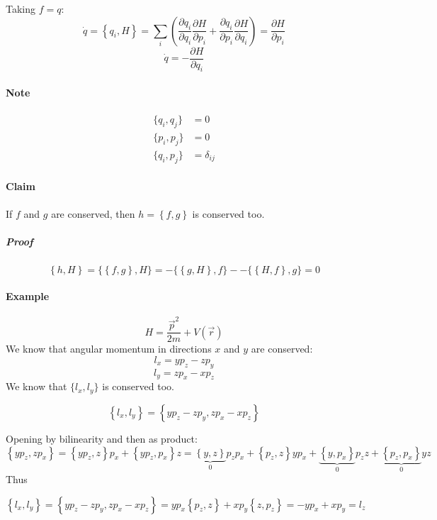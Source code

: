 Taking $f=q$:
$$\dot{q} = \left\{ q_i, H \right\} = \sum_i \left( \frac{\partial q_i}{\partial q_i} \frac{\partial H}{\partial p_i} + \frac{\partial q_i}{\partial p_i} \frac{\partial H}{\partial q_i}  \right) = \frac{\partial H}{\partial p_i}$$
$$\dot{q} = -\frac{\partial H}{\partial q_i}$$

\paragraph{Note}
\begin{align*}
\{q_i,q_j\} &= 0 \\
\{p_i,p_j\} &= 0 \\
\{q_i,p_j\} &= \delta_{ij}
\end{align*}

\paragraph{Claim}
If $f$ and $g$ are conserved, then $h=\left\{ f,g \right\}$ is conserved too.
\subparagraph{Proof}
$$\left\{ h,H \right\} = \big\{ \left\{f,g \right\}, H \big\} = - \big\{ \left\{g,H \right\}, f \big\} - - \big\{ \left\{H,f \right\}, g \big\}  = 0$$

\paragraph{Example}
$$H = \frac{\vec{p}^2}{2m} + V(\vec{r})$$
We know that angular momentum in directions $x$ and $y$ are conserved:
$$l_x = yp_z-zp_y$$
$$l_y = zp_x - xp_z$$
We know that $\{ l_x, l_y \}$ is conserved too.

$$\left\{ l_x, l_y \right\} = \left\{ yp_z - zp_y, zp_x - xp_z \right\}$$

Opening by bilinearity and then as product:
$$\left\{ yp_z, zp_x  \right\} =\left\{ yp_z, z  \right\}p_x + \left\{ yp_z, p_x \right\}z = \underbrace{\left\{ y, z  \right\}}_{0}p_zp_x + \left\{ p_z, z  \right\}yp_x + \underbrace{\left\{ y, p_x \right\}}_{0}p_zz+ \underbrace{\left\{p_z, p_x \right\}}_{0} yz  $$
Thus

$$\left\{ l_x, l_y \right\} = \left\{ yp_z - zp_y, zp_x - xp_z \right\} = yp_x\left\{ p_z, z \right\} + xp_y \left\{ z,p_z \right\} = -yp_x + xp_y = l_z$$